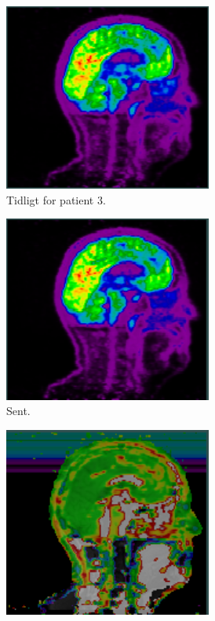 \begin{figure}[H]
\begin{subfigure}{0.3\textwidth}
        \includegraphics[width=0.75\textwidth]{colager/over_tid_pet/over_tid_210445_early.png}
        \caption{Tidligt for patient 3.}
        \label{col:over_time_pet_pat3_early}
    \end{subfigure}\hfill
    \begin{subfigure}{0.3\textwidth}
        \centering
        \includegraphics[width=0.75\textwidth]{colager/over_tid_pet/over_tid_210445_late.png}
        \caption{Sent.}
        \label{col:over_time_pet_pat3_late}
    \end{subfigure}\hfill
    \begin{subfigure}{0.3\textwidth}
        \centering
        \includegraphics[width=0.75\textwidth]{colager/over_tid_pet/over_tid_210445_pd.png}

\end{subfigure}
\end{figure}
